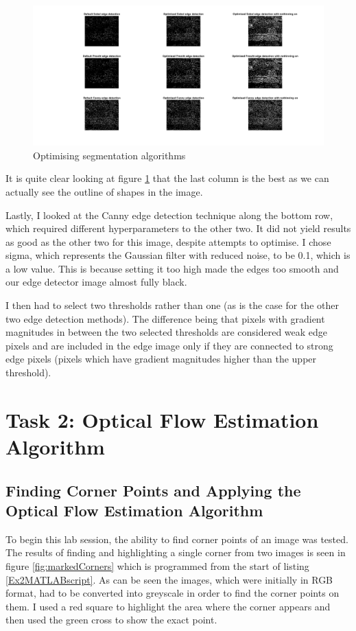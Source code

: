 \documentclass[11pt, letterpaper]{article}
\begin{document}
\begin{figure}[ht]
    \centering
    \includegraphics[width=1\linewidth]{Lab 1/AllSegmentation.png}
    \caption{Optimising segmentation algorithms}
    \label{fig:AllSegmentation}
\end{figure}

It is quite clear looking at figure \ref{fig:AllSegmentation} that the last column is the best as we can actually see the outline of shapes in the image. 

Lastly, I looked at the Canny edge detection technique along the bottom row, which required different hyperparameters to the other two. It did not yield results as good as the other two for this image, despite attempts to optimise. I chose sigma, which represents the Gaussian filter with reduced noise, to be 0.1, which is a low value. This is because setting it too high made the edges too smooth and our edge detector image almost fully black.

I then had to select two thresholds rather than one (as is the case for the other two edge detection methods). The difference being that pixels with gradient magnitudes in between the two selected thresholds are considered weak edge pixels and are included in the edge image only if they are connected to strong edge pixels (pixels which have gradient magnitudes higher than the upper threshold).

\clearpage
\section{Task 2: Optical Flow Estimation Algorithm}

\subsection{Finding Corner Points and Applying the Optical Flow Estimation Algorithm}
To begin this lab session, the ability to find corner points of an image was tested. The results of finding and highlighting a single corner from two images is seen in figure \ref{fig:markedCorners} which is programmed from the start of listing \ref{Ex2MATLABscript}. As can be seen the images, which were initially in RGB format, had to be converted into greyscale in order to find the corner points on them. I used a red square to highlight the area where the corner appears and then used the green cross to show the exact point. 
\end{document}

